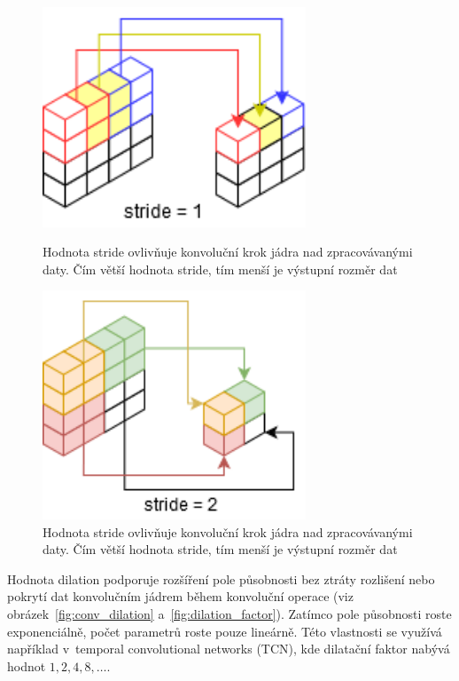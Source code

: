 \begin{figure}[H]
    \centering
    \begin{minipage}{0.45\textwidth}
        \centering
        \includegraphics[width=0.7\textwidth]{obrazky-figures/stride1.png}
        \caption{\label{fig:conv_stride1}Hodnota stride ovlivňuje konvoluční krok jádra nad zpracovávanými daty. Čím větší hodnota stride, tím menší je výstupní rozměr dat}
    \end{minipage}\hfill
    \begin{minipage}{0.45\textwidth}
        \centering
        \includegraphics[width=0.7\textwidth]{obrazky-figures/stride2.png}
        \caption{\label{fig:conv_stride2}Hodnota stride ovlivňuje konvoluční krok jádra nad zpracovávanými daty. Čím větší hodnota stride, tím menší je výstupní rozměr dat}
    \end{minipage}
\end{figure}


Hodnota dilation podporuje rozšíření pole působnosti bez ztráty rozlišení nebo pokrytí dat konvolučním jádrem během konvoluční operace (viz obrázek~\ref{fig:conv_dilation} a~\ref{fig:dilation_factor}). Zatímco pole působnosti roste exponenciálně, počet parametrů roste pouze lineárně. Této vlastnosti se využívá například v~temporal convolutional networks (TCN), kde dilatační faktor nabývá hodnot $1, 2, 4, 8, \dots$.

